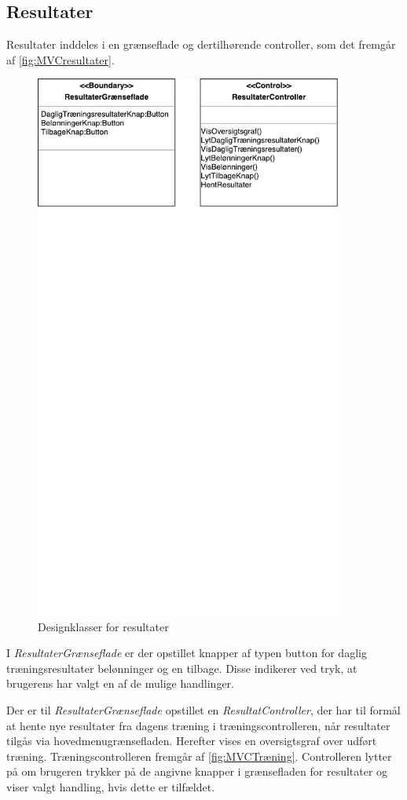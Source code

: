 \subsection{Resultater}
Resultater inddeles i en grænseflade og dertilhørende controller, som det fremgår af \autoref{fig:MVCresultater}. 

\begin{figure} [H]
\centering
\includegraphics[width=0.9\textwidth]{figures/MVC/Resultater}
\caption{Designklasser for resultater}
\label{fig:MVCresultater}
\end{figure}

\noindent
I \textit{ResultaterGrænseflade} er der opstillet knapper af typen button for daglig træningsresultater belønninger og en tilbage. Disse indikerer ved tryk, at brugerens har valgt en af de mulige handlinger. 
 
Der er til \textit{ResultaterGrænseflade} opstillet en \textit{ResultatController}, der har til formål at hente nye resultater fra dagens træning i træningscontrolleren, når resultater tilgås via hovedmenugrænsefladen. Herefter vises en oversigtsgraf over udført træning. Træningscontrolleren fremgår af \autoref{fig:MVCTræning}. Controlleren lytter på om brugeren trykker på de angivne knapper i grænsefladen for resultater og viser valgt handling, hvis dette er tilfældet. 
